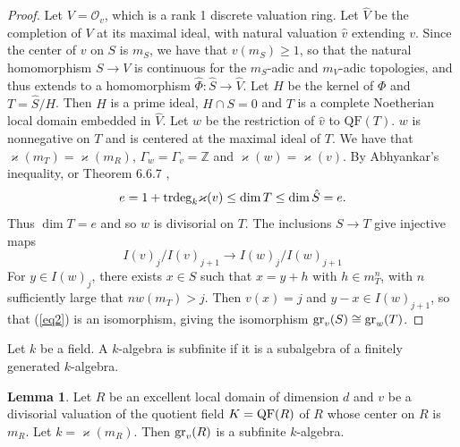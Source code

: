 \documentclass[11pt]{amsart}
\def\NZQ{\mathbb}               %
\def\ZZ{{\NZQ Z}}
\theoremstyle{definition}
\newtheorem{Lemma}[Theorem]{Lemma}
\let\kappa=\varkappa
\begin{document}
\begin{proof} Let $V=\mathcal O_v$, which is a rank 1 discrete valuation ring. Let $\hat V$ be the completion of $V$ at its maximal ideal, with natural valuation $\hat v$ extending $v$. Since the center of $v$ on $S$ is $m_S$, we have that $v(m_S)\ge 1$, so that the natural homomorphism $S\rightarrow V$ is continuous for the $m_S$-adic and $m_V$-adic topologies, and thus extends to a homomorphism $\hat\Phi:\hat S\rightarrow \hat V$. Let $H$ be the kernel of $\Phi$ and $T=\hat S/H$. Then $H$ is a prime ideal, $H\cap S=0$ and $T$ is a complete Noetherian local domain embedded in $\hat V$. Let $w$ be the restriction of $\hat v$ to $\mbox{QF}(T)$. $w$ is nonnegative on $T$ and is centered at the maximal ideal of $T$. We have that 
$\kappa(m_T)=\kappa(m_R)$, $\Gamma_w=\Gamma_v=\ZZ$ and $\kappa(w)=\kappa(v)$. By Abhyankar's inequality, \cite{Ab} or Theorem 6.6.7 \cite{HS},
$$
e=1+{\rm trdeg}_k\kappa(v)\le \dim T\le \dim \hat S=e.
$$
Thus $\dim T=e$ and so $w$ is divisorial on $T$. The inclusions $S\rightarrow T$ give injective maps
\begin{equation}\label{eq2}
I(v)_j/I(v)_{j+1}\rightarrow I(w)_j/I(w)_{j+1}
\end{equation}
For $y\in I(w)_j$, there exists $x\in S$ such that $x=y+h$ with $h\in m_T^n$, with $n$ sufficiently large that $nw(m_T)>j$. Then $v(x)=j$ and $y-x\in I(w)_{j+1}$, so that (\ref{eq2}) is an isomorphism, giving the isomorphism ${\rm gr}_v(S)\cong {\rm gr}_w(T)$.
\end{proof}

Let $k$ be a field. A $k$-algebra is subfinite if it is a subalgebra of a finitely generated $k$-algebra.

\begin{Lemma}\label{Lemma2}
Let $R$ be an excellent local domain of dimension $d$ and $v$ be a divisorial valuation of the quotient field $K={\rm QF}(R)$ of $R$ whose center on $R$ is $m_R$. Let $k=\kappa(m_R)$. Then ${\rm gr}_v(R)$ is a subfinite $k$-algebra.
\end{Lemma}
\end{document}
